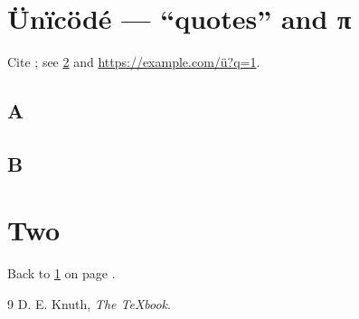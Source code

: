 \documentclass{article}
\begin{document}
\section{Ünïcödé — “quotes” and π}\label{s:u}
Cite \cite{knuth}; see \ref{s:two} and \url{https://example.com/ü?q=1}.
\subsection{A}
\subsection{B}
\newpage
{}
\section{Two}\label{s:two}
Back to \ref{s:u} on page \pageref{s:u}.
\begin{thebibliography}{9}
 D. E. Knuth, \emph{The \TeX book}.
\end{thebibliography}
\end{document}
